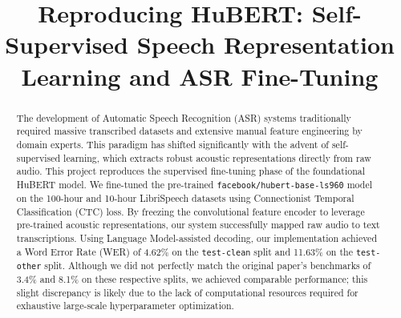\documentclass[conference]{IEEEtran}
\title{Reproducing HuBERT: Self-Supervised Speech Representation Learning and ASR Fine-Tuning}
\author{
\IEEEauthorblockN{Gal Barak}
\IEEEauthorblockA{\textit{ID: 211699707}}
\and
\IEEEauthorblockN{Adam Fleisher}
\IEEEauthorblockA{\textit{ID: 211603469}}
\and
\IEEEauthorblockN{Ilia Benkovitch}
\IEEEauthorblockA{\textit{ID: 316857820}}
}
\begin{document}
\maketitle

\begin{abstract}
The development of Automatic Speech Recognition (ASR) systems traditionally required massive transcribed datasets and extensive manual feature engineering by domain experts.
This paradigm has shifted significantly with the advent of self-supervised learning, which extracts robust acoustic representations directly from raw audio.
This project reproduces the supervised fine-tuning phase of the foundational HuBERT model.
We fine-tuned the pre-trained \texttt{facebook/hubert-base-ls960} model on the 100-hour and 10-hour LibriSpeech datasets using Connectionist Temporal Classification (CTC) loss.
By freezing the convolutional feature encoder to leverage pre-trained acoustic representations, our system successfully mapped raw audio to text transcriptions.
Using Language Model-assisted decoding, our implementation achieved a Word Error Rate (WER) of 4.62\% on the \texttt{test-clean} split and 11.63\% on the \texttt{test-other} split.
Although we did not perfectly match the original paper's benchmarks of 3.4\% and 8.1\% on these respective splits, we achieved comparable performance;
this slight discrepancy is likely due to the lack of computational resources required for exhaustive large-scale hyperparameter optimization.
\end{abstract}
\end{document}
